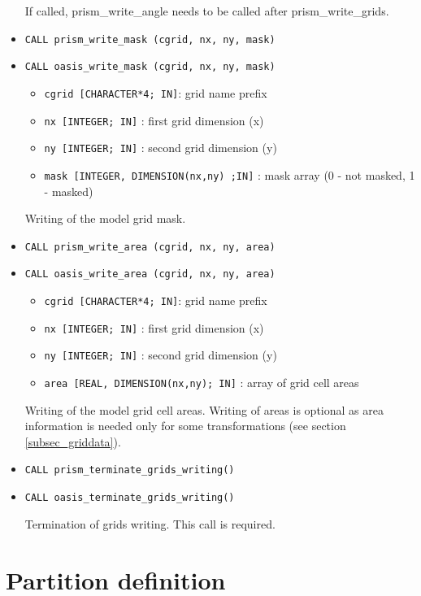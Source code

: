 \begin{itemize}
 If called,
 prism\_write\_angle needs to be called after prism\_write\_grids.

\item {\tt CALL prism\_write\_mask (cgrid, nx, ny, mask)}
\item {\tt CALL oasis\_write\_mask (cgrid, nx, ny, mask)}

 \begin{itemize}
    \item {\tt cgrid [CHARACTER*4; IN]}: grid name prefix 
    \item {\tt nx [INTEGER; IN]} : first grid dimension (x)
    \item {\tt ny [INTEGER; IN]} : second grid dimension (y)
    \item {\tt mask [INTEGER, DIMENSION(nx,ny) ;IN]} : mask array (0 - not masked, 1 - masked)
 \end{itemize}
Writing of the model grid mask.

\item {\tt CALL prism\_write\_area (cgrid, nx, ny, area)}
\item {\tt CALL oasis\_write\_area (cgrid, nx, ny, area)}

 \begin{itemize}
    \item {\tt cgrid [CHARACTER*4; IN]}: grid name prefix
    \item {\tt nx [INTEGER; IN]} : first grid dimension (x)
    \item {\tt ny [INTEGER; IN]} : second grid dimension (y)
    \item {\tt area [REAL, DIMENSION(nx,ny); IN]} : array of grid cell areas
 \end{itemize}
Writing of the model grid cell areas. Writing of areas is optional as
area information is needed only for some transformations (see section
\ref{subsec_griddata}).

\item {\tt CALL prism\_terminate\_grids\_writing()}
\item {\tt CALL oasis\_terminate\_grids\_writing()}

Termination of grids writing.  This call is required.

\end{itemize}

\section{Partition definition}
\label{subsubsec_Partition}

